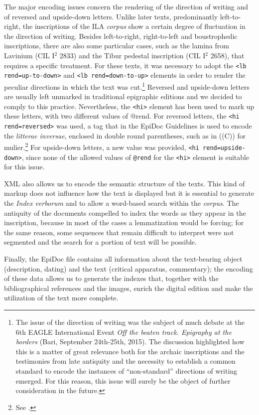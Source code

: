 \documentclass[amsthm,ebook]{saparticle}
\begin{document}
The major encoding issues concern the rendering of the direction of writing and of reversed and upside-down letters.
Unlike later texts, predominantly left-to-right, the inscriptions of the ILA \emph{corpus} show a certain degree of
fluctuation in the direction of writing. Besides left-to-right, right-to-left and boustrophedic inscriptions, there are
also some particular cases, such as the lamina from Lavinium (CIL I$^2$ 2833) and the Tibur pedestal inscription (CIL I$^2$
2658), that requires a specific treatment. For these texts, it was necessary to adopt the \texttt{{\textless}lb
rend={\textquotedbl}up-to-down{\textquotedbl}{\textgreater}} and \texttt{{\textless}lb
rend={\textquotedbl}down-to-up{\textquotedbl}{\textgreater}} elements in order to render the peculiar directions in
which the text was cut.\footnote{The issue of the direction of writing was the subject of much debate at the 6th EAGLE
International Event \emph{Off the beaten track. Epigraphy at the borders} (Bari, September 24th{}-25th, 2015). The discussion
highlighted how this is a matter of great relevance both for the archaic inscriptions and the testimonies from late
antiquity and the necessity to establish a common standard to encode the instances of ``non-standard'' directions of
writing emerged. For this reason, this issue will surely be the object of further consideration in the future.}
Reversed and upside-down letters are usually left unmarked in traditional epigraphic editions and we decided to comply
to this practice. Nevertheless, the \texttt{{\textless}hi{\textgreater}} element has been used to mark up these letters, with
two different values of @rend. For reversed letters, the \texttt{{\textless}hi
rend={\textquotedbl}reversed{\textquotedbl}{\textgreater}} was used, a tag that in the EpiDoc Guidelines is used to
encode the \emph{litterae inversae}, enclosed in double round parentheses, such as in ((C)) for mulier.\footnote{See \citet[1722]{panciera_i_2006}.} For upside-down letters, a new value was provided, \texttt{{\textless}hi
rend={\textquotedbl}upside-down{\textquotedbl}{\textgreater}}, since none of the allowed values of \texttt{@rend} for the
\texttt{{\textless}hi{\textgreater}} element is suitable for this issue.

XML also allows us to encode the semantic structure of the texts. This kind of markup does not influence how the text is
displayed but it is essential to generate the \emph{Index verborum} and to allow a word-based search within the \emph{corpus}. The
antiquity of the documents compelled to index the words as they appear in the inscription, because in most of the cases
a lemmatization would be forcing; for the same reason, some sequences that remain difficult to interpret were not
segmented and the search for a portion of text will be possible. 

Finally, the EpiDoc file contains all information about the text-bearing object (description, dating) and the text
(critical apparatus, commentary); the encoding of these data allows us to generate the indexes that, together with the
bibliographical references and the images, enrich the digital edition and make the utilization of the text more
complete. 

\nocite{colonna_iscrizioni_2007}


\end{document}
